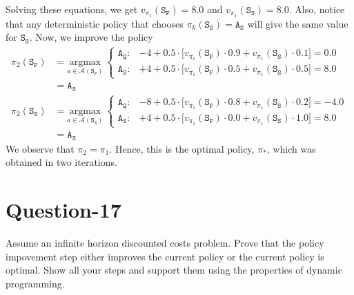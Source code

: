 \documentclass[11pt]{article}
\begin{document}
    Solving these equations, we get $v_{\pi_{1}}(\texttt{S}_{\texttt{F}}) = 8.0$ and $v_{\pi_{1}}(\texttt{S}_{\texttt{S}}) = 8.0$. Also, notice that
    any deterministic policy that chooses $\pi_{k}(\texttt{S}_{\texttt{S}}) = \texttt{A}_{\texttt{S}}$ will give the same value for $\texttt{S}_{\texttt{S}}$.
    Now, we improve the policy
    \begin{align*}
        \pi_{2}(\texttt{S}_{\texttt{F}}) &= \underset{a \in \mathcal{A}(\texttt{S}_{\texttt{F}})}{\mathrm{argmax}} \
        \begin{cases}
            \texttt{A}_{\texttt{Q}}: & -4 + 0.5 \cdot \big[ v_{\pi_{1}}(\texttt{S}_{\texttt{F}}) \cdot 0.9 + v_{\pi_{1}}(\texttt{S}_{\texttt{S}}) \cdot 0.1 \big] = 0.0 \\
            \texttt{A}_{\texttt{S}}: & +4 + 0.5 \cdot \big[ v_{\pi_{1}}(\texttt{S}_{\texttt{F}}) \cdot 0.5 + v_{\pi_{1}}(\texttt{S}_{\texttt{S}}) \cdot 0.5 \big] = 8.0
        \end{cases} \\
        &= \texttt{A}_{\texttt{S}} \\
        \pi_{2}(\texttt{S}_{\texttt{S}}) &= \underset{a \in \mathcal{A}(\texttt{S}_{\texttt{S}})}{\mathrm{argmax}} \
        \begin{cases}
            \texttt{A}_{\texttt{Q}}: & -8 + 0.5 \cdot \big[ v_{\pi_{1}}(\texttt{S}_{\texttt{F}}) \cdot 0.8 + v_{\pi_{1}}(\texttt{S}_{\texttt{S}}) \cdot 0.2 \big] = -4.0 \\
            \texttt{A}_{\texttt{S}}: & +4 + 0.5 \cdot \big[ v_{\pi_{1}}(\texttt{S}_{\texttt{F}}) \cdot 0.0 + v_{\pi_{1}}(\texttt{S}_{\texttt{S}}) \cdot 1.0 \big] = 8.0
        \end{cases} \\
        &= \texttt{A}_{\texttt{S}}
    \end{align*}
    We observe that $\pi_{2} = \pi_{1}$. Hence, this is the optimal policy, $\pi_{*}$, which was obtained in two iterations.

    \section*{Question-17}
    Assume an infinite horizon discounted costs problem. Prove that the policy impovement step either
    improves the current policy or the current policy is optimal. Show all your steps and support them
    using the properties of dynamic programming.
\end{document}
